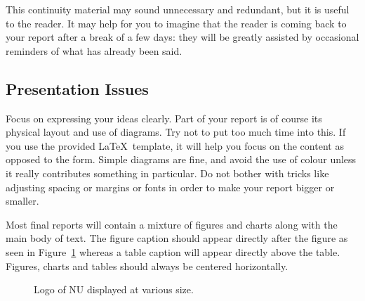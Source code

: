 \documentclass[]{final_report}
\begin{document}
This continuity material may sound unnecessary and redundant, but it is useful to the reader. It may help for you to imagine that the reader is coming back to your report after a break of a few days: they will be greatly assisted by occasional reminders of what has already been said.

\subsection{Presentation Issues}

Focus on expressing your ideas clearly. Part of your report is of course its physical layout and use of diagrams. Try not to put too much time into this. If you use the provided \LaTeX\ template, it will help you focus on the content as opposed to the form. Simple diagrams are fine, and avoid the use of colour unless it really contributes something in particular. Do not bother with tricks like adjusting spacing or margins or fonts in order to make your report bigger or smaller.

Most final reports will contain a mixture of figures and charts along with the main body of text. The figure caption should appear directly after the figure as seen in Figure~\ref{fig:logo} whereas a table caption will appear directly above the table. Figures, charts and tables should always be centered horizontally. 

\begin{figure}[ht]
\centering
\fboxsep 2mm
\caption{\label{fig:logo} Logo of NU displayed at various size.}
\end{figure} 
\end{document}
